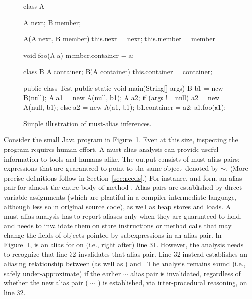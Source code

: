 \begin{figure}[htb!p]
\vspace{-0.4cm}
\begin{minipage}[l]{3in}
\begin{javacode}
class A { 
  A next; 
  B member;

  A(A next, B member) {
    this.next = next;
    this.member = member;
  }

  void foo(A a) {
    member.container = a;
  }
}

class B {
  A container;
  B(A container) { 
    this.container = container; 
  }
}

public class Test {
  public static void main(String[] args) {
    B b1 = new B(null);
    A a1 = new A(null, b1);
    A a2;
    if (args != null) 
      a2 = new A(null, b1);
    else
      a2 = new A(a1, b1);
    b1.container = a2;
    a1.foo(a1);
  }
}
\end{javacode}
\end{minipage}
\caption{Simple illustration of must-alias inferences. }
\label{fig:example}
\end{figure}

Consider the small Java program in Figure~\ref{fig:example}. Even at this size,
inspecting the program requires human effort. A must-alias analysis can provide
useful information to tools and humans alike. The output consists of must-alias
pairs: expressions that are guaranteed to point to the same object--denoted by
$\sim$. (More precise definitions follow in Section~\ref{sec:needs}.) For
instance,  and  form an alias pair for almost the entire
body of method .  Alias pairs are established by direct variable
assignments (which are plentiful in a compiler intermediate language, although
less so in original source code), as well as heap stores and loads. A
must-alias analysis has to report aliases only when they are guaranteed to
hold, and needs to invalidate them on store instructions or method calls that
may change the fields of objects pointed by subexpressions in an alias pair. In
Figure~\ref{fig:example},  is an alias for  on (i.e.,
right after) line 31. However, the analysis needs to recognize that line 32
invalidates that alias pair. Line 32 instead establishes an aliasing
relationship between  (as well as )
and . The analysis remains sound (i.e., safely under-approximate) if the
earlier  $\sim$  alias pair is invalidated, regardless
of whether the new alias pair ( $\sim$ ) is
established, via inter-procedural reasoning, on line 32. 

